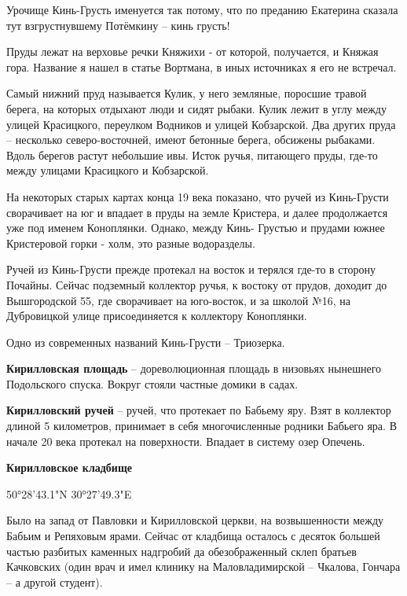 Урочище Кинь-Грусть именуется так потому, что по преданию Екатерина сказала тут взгрустнувшему Потёмкину – кинь грусть!

Пруды лежат на верховье речки Княжихи - от которой, получается, и Княжая гора. Название я нашел в статье Вортмана, в иных источниках я его не встречал. 

Самый нижний пруд называется Кулик, у него земляные, поросшие травой берега, на которых отдыхают люди и сидят рыбаки. Кулик лежит в углу между улицей Красицкого, переулком Водников и улицей Кобзарской. Два других пруда – несколько северо-восточней, имеют бетонные берега, обсижены рыбаками. Вдоль берегов растут небольшие ивы. Исток ручья, питающего пруды, где-то между улицами Красицкого и Кобзарской.

На некоторых старых картах конца 19 века показано, что ручей из Кинь-Грусти сворачивает на юг и впадает в пруды на земле Кристера, и далее продолжается уже под именем Коноплянки. Однако, между Кинь- Грустью и прудами южнее Кристеровой горки - холм, это разные водоразделы.

Ручей из Кинь-Грусти прежде протекал на восток и терялся где-то в сторону Почайны. Сейчас подземный коллектор ручья, к востоку от прудов, доходит до Вышгородской 55, где сворачивает на юго-восток, и за школой №16, на Дубровицкой улице присоединяется к коллектору Коноплянки.

Одно из современных названий Кинь-Грусти – Триозерка.\\


\medskip


\textbf{Кирилловская площадь} – дореволюционная площадь в низовьях нынешнего Подольского спуска. Вокруг стояли частные домики в садах.\\


\medskip


\textbf{Кирилловский ручей} – ручей, что протекает по Бабьему яру. Взят в коллектор длиной 5 километров, принимает в себя многочисленные родники Бабьего яра. В начале 20 века протекал на поверхности. Впадает в систему озер Опечень.\\

\medskip

\textbf{Кирилловское кладбище} 

50°28'43.1"N 30°27'49.3"E

Было на запад от Павловки и Кирилловской церкви, на возвышенности между Бабьим и Репяховым ярами. Сейчас от кладбища осталось с десяток большей частью разбитых каменных надгробий да обезображенный склеп братьев Качковских (один врач и имел клинику на Маловладимирской – Чкалова, Гончара – а другой студент).

